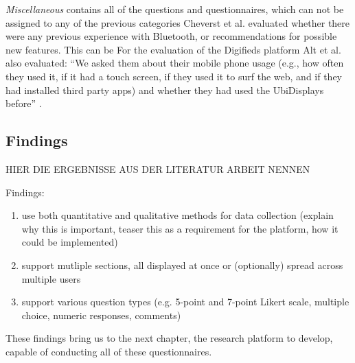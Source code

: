 		\textit{Miscellaneous} contains all of the questions and questionnaires, which can not be assigned to any of the previous categories 
		Cheverst et al. \cite{cheverst2005hermes} evaluated whether there were any previous experience with Bluetooth, or recommendations for possible new features. This can be 
		For the evaluation of the Digifieds platform Alt et al. also evaluated: ``We asked them about their mobile phone usage (e.g., how often they used it, if it had a touch screen, if they used it to surf the web, and if they had installed third party apps) and whether they had used the UbiDisplays before'' \cite{alt2011digifieds}.









\subsection{Findings}
\label{section:questionnaires:findings}

	HIER DIE ERGEBNISSE AUS DER LITERATUR ARBEIT NENNEN




	Findings: 
	\begin{enumerate}
	\item use both quantitative and qualitative methods for data collection (explain why this is important, teaser this as a requirement for the platform, how it could be implemented)
	\item support mutliple sections, all displayed at once or (optionally) spread across multiple users
	\item support various question types (e.g. 5-point and 7-point Likert scale, multiple choice, numeric responses, comments)
	\end{enumerate}




	These findings bring us to the next chapter, the research platform to develop, capable of conducting all of these questionnaires.






